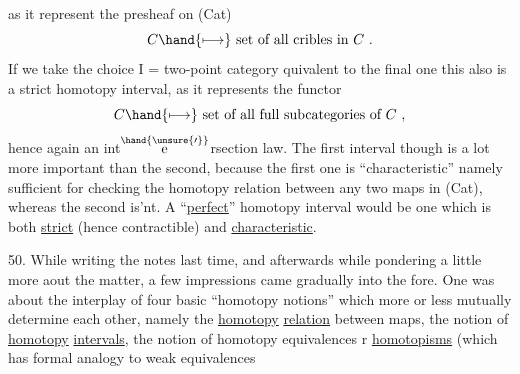 as it represent the  presheaf on (Cat)
\[ C \hand{\longmapsto} \text{ set of all cribles in } C \ . \]
If we take the choice I = two-point category quivalent to the final one\hand{,}
this also is a strict homotopy interval, as it represents the functor
\[ C \hand{\longmapsto} \text{ set of all full subcategories of } C \ , \]
hence again an int$\overset{\hand{\unsure{\prime}}}{\mathrm e}$rsection law. The first  interval though is a lot more
important than the second, because the first one is ``characteristic''
namely sufficient for checking the homotopy relation between any two
maps in (Cat), whereas the second is'nt. A ``\uline{perfect}'' homotopy interval
would be one which is both \uline{strict} (hence contractible) and \uline{characteristic}.


50. While writing the notes last time, and afterwards while pondering
a little more aout the matter, a few impressions came gradually into the
fore. One was about the interplay of four basic ``homotopy notions'' which
more or less mutually determine each other, namely the \uline{homotopy} \uline{relation}
between maps, the notion of \uline{homotopy} \uline{intervals}, the notion of homotopy
equivalences r \uline{homotopisms} (which has formal analogy to weak equivalences\hand{,}

